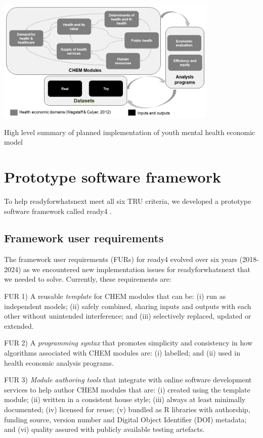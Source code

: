 \documentclass[sn-vancouver,Numbered,pdflatex]{sn-jnl}
\theoremstyle{remark}
\theoremstyle{definition}
\let\origfigure\figure
\begin{document}
\bgroup 
    \origfigure[H]

\includegraphics[width=400px,]{Figure1} \caption{High level summary of planned implementation of youth mental health economic model}\label{fig:fig1}

    \endfigure
\egroup

\hypertarget{prototype-software-framework}{%
\section{Prototype software framework}\label{prototype-software-framework}}

To help readyforwhatsnext meet all six TRU criteria, we developed a prototype software framework called ready4 \citep{ready424}.

\hypertarget{framework-user-requirements}{%
\subsection{Framework user requirements}\label{framework-user-requirements}}

The framework user requirements (FURs) for ready4 evolved over six years (2018-2024) as we encountered new implementation issues for readyforwhatsnext that we needed to solve. Currently, these requirements are:

FUR 1) A reusable \emph{template} for CHEM modules that can be: (i) run as independent models; (ii) safely combined, sharing inputs and outputs with each other without unintended interference; and (iii) selectively replaced, updated or extended.

FUR 2) A \emph{programming syntax} that promotes simplicity and consistency in how algorithms associated with CHEM modules are: (i) labelled; and (ii) used in health economic analysis programs.

FUR 3) \emph{Module authoring tools} that integrate with online software development services to help author CHEM modules that are: (i) created using the template module; (ii) written in a consistent house style; (iii) always at least minimally documented; (iv) licensed for reuse; (v) bundled as R libraries with authorship, funding source, version number and Digital Object Identifier (DOI) metadata; and (vi) quality assured with publicly available testing artefacts.
\end{document}
